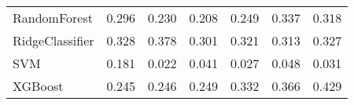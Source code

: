 \begin{tabular}{lllllll}
                   RandomForest & 0.296 &                     0.230 &                 0.208 &                  0.249 &                                   0.337 &     0.318 \\
                RidgeClassifier & 0.328 &                     0.378 &                 0.301 &                  0.321 &                                   0.313 &     0.327 \\
                            SVM & 0.181 &                     0.022 &                 0.041 &                  0.027 &                                   0.048 &     0.031 \\
                        XGBoost & 0.245 &                     0.246 &                 0.249 &                  0.332 &                                   0.366 &     0.429 \\
\bottomrule
\end{tabular}
